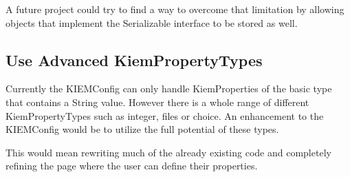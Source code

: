 A future project could try to find a way to overcome that limitation by allowing
objects that implement the Serializable interface to be stored as well.

\subsection*{Use Advanced KiemPropertyTypes}
Currently the \ac{KIEMConfig} can only handle KiemProperties of the basic type that
contains a String value. However there is a whole range of different KiemPropertyTypes
such as integer, files or choice. An enhancement to the \ac{KIEMConfig} would be to
utilize the full potential of these types.

This would mean rewriting much of the already existing code and completely refining
the page where the user can define their properties.